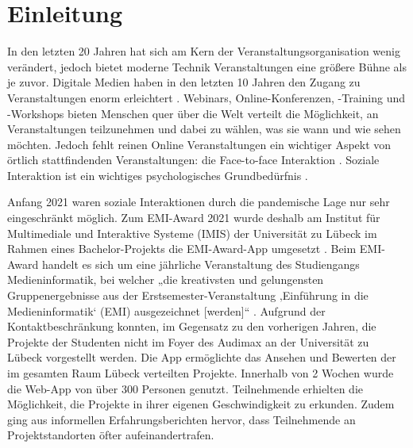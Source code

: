 \chapter{Einleitung}


In den letzten 20 Jahren hat sich am Kern der Veranstaltungsorganisation wenig
verändert, jedoch bietet moderne Technik Veranstaltungen eine größere Bühne als
je zuvor. Digitale Medien haben in den letzten 10 Jahren den Zugang zu
Veranstaltungen enorm erleichtert \cite{Bladen2012}. Webinars,
Online-Konferenzen, -Training und -Workshops bieten Menschen quer über die Welt
verteilt die Möglichkeit, an Veranstaltungen teilzunehmen und dabei zu wählen,
was sie wann und wie sehen möchten. Jedoch fehlt reinen Online Veranstaltungen
ein wichtiger Aspekt von örtlich stattfindenden Veranstaltungen: die
Face-to-face Interaktion \cite{Bladen2012}. Soziale Interaktion ist ein wichtiges
psychologisches Grundbedürfnis \cite{Maslow1943}.

Anfang 2021 waren soziale Interaktionen durch die pandemische Lage nur sehr
eingeschränkt möglich. Zum EMI-Award 2021 wurde deshalb am Institut für
Multimediale und Interaktive Systeme (IMIS) der Universität zu Lübeck im Rahmen
eines Bachelor-Projekts die EMI-Award-App umgesetzt \cite{Canzler2021}. Beim
EMI-Award handelt es sich um eine jährliche Veranstaltung des Studiengangs
Medieninformatik, bei welcher „die kreativsten und gelungensten
Gruppenergebnisse aus der Erstsemester-Veranstaltung ‚Einführung in die
Medieninformatik‘ (EMI) ausgezeichnet [werden]“ \cite{UniversitatzuLubeck2021}.
Aufgrund der Kontaktbeschränkung konnten, im Gegensatz zu den vorherigen Jahren,
die Projekte der Studenten nicht im Foyer des Audimax an der Universität zu
Lübeck vorgestellt werden. Die App ermöglichte das Ansehen und Bewerten der im
gesamten Raum Lübeck verteilten Projekte. Innerhalb von 2 Wochen wurde die
Web-App von über 300 Personen genutzt. Teilnehmende erhielten die Möglichkeit,
die Projekte in ihrer eigenen Geschwindigkeit zu erkunden. Zudem ging aus
informellen Erfahrungsberichten hervor, dass Teilnehmende an Projektstandorten
öfter aufeinandertrafen.


